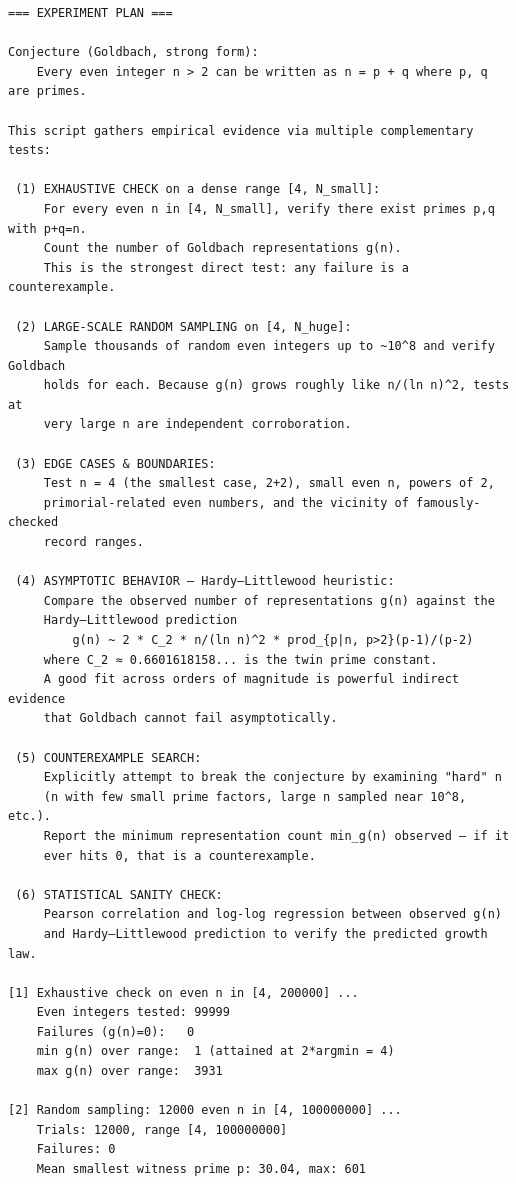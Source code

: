 \documentclass[11pt]{article}
\begin{document}
\begin{lstlisting}
=== EXPERIMENT PLAN ===

Conjecture (Goldbach, strong form):
    Every even integer n > 2 can be written as n = p + q where p, q are primes.

This script gathers empirical evidence via multiple complementary tests:

 (1) EXHAUSTIVE CHECK on a dense range [4, N_small]:
     For every even n in [4, N_small], verify there exist primes p,q with p+q=n.
     Count the number of Goldbach representations g(n).
     This is the strongest direct test: any failure is a counterexample.

 (2) LARGE-SCALE RANDOM SAMPLING on [4, N_huge]:
     Sample thousands of random even integers up to ~10^8 and verify Goldbach
     holds for each. Because g(n) grows roughly like n/(ln n)^2, tests at
     very large n are independent corroboration.

 (3) EDGE CASES & BOUNDARIES:
     Test n = 4 (the smallest case, 2+2), small even n, powers of 2,
     primorial-related even numbers, and the vicinity of famously-checked
     record ranges.

 (4) ASYMPTOTIC BEHAVIOR — Hardy–Littlewood heuristic:
     Compare the observed number of representations g(n) against the
     Hardy–Littlewood prediction
         g(n) ~ 2 * C_2 * n/(ln n)^2 * prod_{p|n, p>2}(p-1)/(p-2)
     where C_2 ≈ 0.6601618158... is the twin prime constant.
     A good fit across orders of magnitude is powerful indirect evidence
     that Goldbach cannot fail asymptotically.

 (5) COUNTEREXAMPLE SEARCH:
     Explicitly attempt to break the conjecture by examining "hard" n
     (n with few small prime factors, large n sampled near 10^8, etc.).
     Report the minimum representation count min_g(n) observed — if it
     ever hits 0, that is a counterexample.

 (6) STATISTICAL SANITY CHECK:
     Pearson correlation and log-log regression between observed g(n)
     and Hardy–Littlewood prediction to verify the predicted growth law.

[1] Exhaustive check on even n in [4, 200000] ...
    Even integers tested: 99999
    Failures (g(n)=0):   0
    min g(n) over range:  1 (attained at 2*argmin = 4)
    max g(n) over range:  3931

[2] Random sampling: 12000 even n in [4, 100000000] ...
    Trials: 12000, range [4, 100000000]
    Failures: 0
    Mean smallest witness prime p: 30.04, max: 601


\end{lstlisting}
\end{document}
